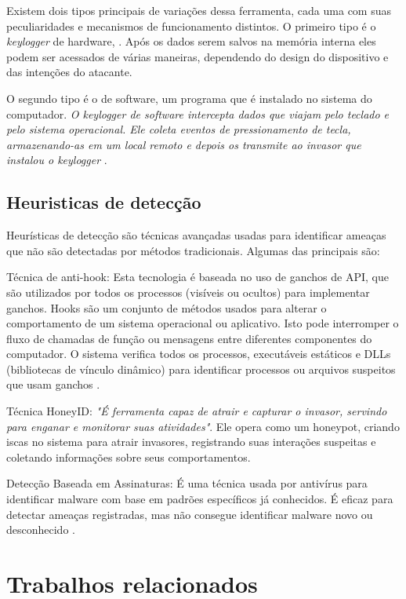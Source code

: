 \documentclass[12pt]{article}
\begin{document}
Existem dois tipos principais de variações dessa ferramenta, cada uma com suas peculiaridades e mecanismos de funcionamento distintos. O primeiro tipo é o \textit{keylogger} de hardware, \textit{}\citep{singh2021keylogger}. Após os dados serem salvos na memória interna eles podem ser acessados de várias maneiras, dependendo do design do dispositivo e das intenções do atacante.

O segundo tipo é o de software, um programa que é instalado no sistema do computador. \textit{O keylogger de software intercepta dados que viajam pelo teclado e pelo sistema operacional. Ele coleta eventos de pressionamento de tecla, armazenando-as em um local remoto e depois os transmite ao invasor que instalou o keylogger} \citep{ahmed2014survey}.

\subsection{Heuristicas de detecção}
Heurísticas de detecção são técnicas avançadas usadas para identificar ameaças que não são detectadas por métodos tradicionais. Algumas das principais são:

Técnica de anti-hook: Esta tecnologia é baseada no uso de ganchos de API, que são utilizados por todos os processos (visíveis ou ocultos) para implementar ganchos. Hooks são um conjunto de métodos usados para alterar o comportamento de um sistema operacional ou aplicativo. Isto pode interromper o fluxo de chamadas de função ou mensagens entre diferentes componentes do computador. O sistema verifica todos os processos, executáveis estáticos e DLLs (bibliotecas de vínculo dinâmico) para identificar processos ou arquivos suspeitos que usam ganchos \citep{solairaj2016keyloggers}.

Técnica HoneyID: \citep{10124477} \textit{"É ferramenta capaz de atrair e capturar o invasor, servindo para enganar e monitorar suas atividades"}. Ele opera como um honeypot, criando iscas no sistema para atrair invasores, registrando suas interações suspeitas e coletando informações sobre seus comportamentos.

Detecção Baseada em Assinaturas: É uma técnica usada por antivírus para identificar malware com base em padrões específicos já conhecidos. É eficaz para detectar ameaças registradas, mas não consegue identificar malware novo ou desconhecido \citep{aslan2020comprehensive}.

\section{Trabalhos relacionados}
\end{document}
